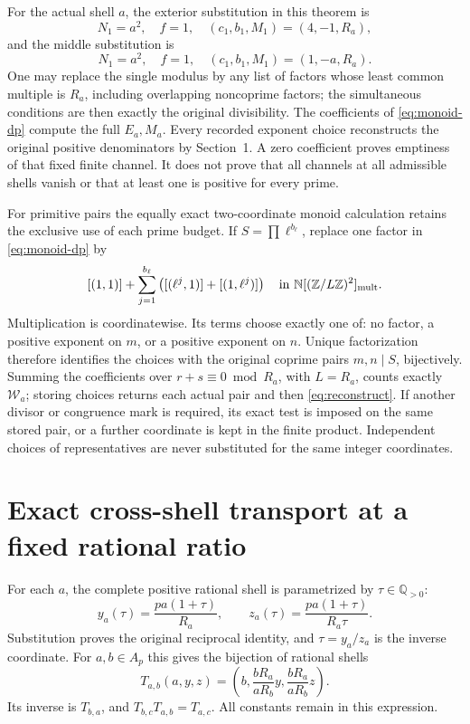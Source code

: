 \documentclass[11pt]{article}
\theoremstyle{definition}\newtheorem{definition}[theorem]{Definition}
\theoremstyle{remark}\newtheorem{remark}[theorem]{Remark}
\newcommand{\Z}{\mathbb Z}\newcommand{\Q}{\mathbb Q}
\newcommand{\N}{\mathbb N}
\begin{document}
For the actual shell \(a\), the exterior substitution in
this theorem is
\[
 N_1=a^2,\quad f=1,\quad(c_1,b_1,M_1)=(4,-1,R_a),
\]
and the middle substitution is
\[
 N_1=a^2,\quad f=1,\quad(c_1,b_1,M_1)=(1,-a,R_a).
\]
One may replace the single modulus by any list of factors
whose least common multiple is \(R_a\), including
overlapping noncoprime factors; the simultaneous conditions
are then exactly the original divisibility.  The coefficients
of \eqref{eq:monoid-dp} compute the full \(E_a,M_a\).
Every recorded exponent choice reconstructs the original
positive denominators by Section~1.  A zero coefficient
proves emptiness of that fixed finite channel.  It does
not prove that all channels at all admissible shells
vanish or that at least one is positive for every prime.

For primitive pairs the equally exact two-coordinate
monoid calculation retains the exclusive use of each
prime budget.  If \(S=\prod\ell^{b_\ell}\), replace one
factor in \eqref{eq:monoid-dp} by
\[
 [(1,1)]+\sum_{j=1}^{b_\ell}
       \left([(\ell^j,1)]+[(1,\ell^j)]\right)
       \quad\text{in }\N[(\Z/L\Z)^2]_{\rm mult}.
\]
Multiplication is coordinatewise.  Its terms choose
exactly one of: no factor, a positive exponent on \(m\),
or a positive exponent on \(n\).  Unique factorization
therefore identifies the choices with the original
coprime pairs \(m,n\mid S\), bijectively.  Summing the
coefficients over \(r+s\equiv0\bmod R_a\), with
\(L=R_a\), counts exactly \(\mathcal W_a\); storing choices
returns each actual pair and then
\eqref{eq:reconstruct}.  If another divisor or congruence
mark is required, its exact test is imposed on the same
stored pair, or a further coordinate is kept in the
finite product.  Independent choices of representatives
are never substituted for the same integer coordinates.






\section{Exact cross-shell transport at a fixed rational ratio}

For each \(a\), the complete positive rational shell is parametrized
by \(\tau\in\Q_{>0}\):
\[
 y_a(\tau)=\frac{pa(1+\tau)}{R_a},\qquad
 z_a(\tau)=\frac{pa(1+\tau)}{R_a\tau}.
\]
Substitution proves the original reciprocal identity, and
\(\tau=y_a/z_a\) is the inverse coordinate.  For \(a,b\in A_p\)
this gives the bijection of rational shells
\begin{equation}\label{eq:rational-transport}
 T_{a,b}(a,y,z)=
 \left(b,\frac{bR_a}{aR_b}y,\frac{bR_a}{aR_b}z\right).
\end{equation}
Its inverse is \(T_{b,a}\), and \(T_{b,c}T_{a,b}=T_{a,c}\).
All constants remain in this expression.
\end{document}
